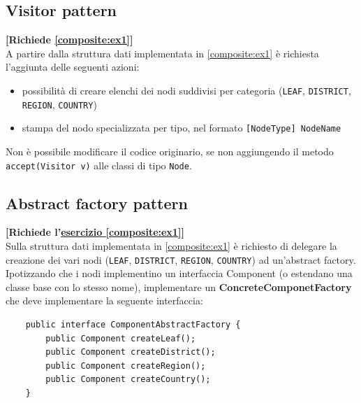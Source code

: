 \documentclass[12pt,a4paper]{article}
\begin{document}
    \subsection{Visitor pattern}\label{pattern:visitors}
    \begin{Exercise}
    \small\textbf{[Richiede \hyperlink{composite:ex1}{\ref{composite:ex1}}]} \\
    A partire dalla struttura dati implementata in \hyperlink{composite:ex1}{\ref{composite:ex1}} è richiesta l'aggiunta delle seguenti azioni:
    \begin{itemize}
        \item possibilità di creare elenchi dei nodi suddivisi per categoria (\texttt{LEAF}, \texttt{DISTRICT}, \texttt{REGION}, \texttt{COUNTRY})
        \item stampa del nodo specializzata per tipo, nel formato \texttt{[NodeType] NodeName}
    \end{itemize}
    Non è possibile modificare il codice originario, se non aggiungendo il metodo \texttt{accept(Visitor v)} alle classi di tipo \texttt{Node}.
    \end{Exercise}
    
    \subsection{Abstract factory pattern}\label{pattern:abstractFactory}
    \begin{Exercise}
    \small\textbf{[Richiede l'\hyperref[composite:ex1]{esercizio \ref{composite:ex1}}]}\\
    Sulla struttura dati implementata in \hyperref[composite:ex1]{\ref{composite:ex1}} è richiesto di delegare la creazione dei vari nodi (\texttt{LEAF}, \texttt{DISTRICT}, \texttt{REGION}, \texttt{COUNTRY}) ad un'abstract factory.
    Ipotizzando che i nodi implementino un interfaccia Component (o estendano una classe base con lo stesso nome), implementare un \textbf{ConcreteComponetFactory} che deve implementare la seguente interfaccia:
    \begin{lstlisting}
    public interface ComponentAbstractFactory {
        public Component createLeaf();
        public Component createDistrict();
        public Component createRegion();
        public Component createCountry();
    }
    \end{lstlisting}
    \end{Exercise}
    
    
    
\end{document}
